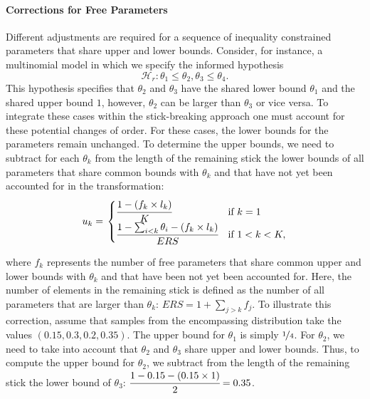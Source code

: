 \begin{appendix}
\hypertarget{corrections-for-free-parameters}{%
\paragraph{Corrections for Free
Parameters}\label{corrections-for-free-parameters}}

Different adjustments are required for a sequence of inequality
constrained parameters that share upper and lower bounds. Consider, for
instance, a multinomial model in which we specify the informed
hypothesis
\[\mathcal{H}_r: \theta_1 \leq \theta_2, \theta_3 \leq \theta_4.\] This
hypothesis specifies that \(\theta_2\) and \(\theta_3\) have the shared
lower bound \(\theta_1\) and the shared upper bound \(1\), however,
\(\theta_2\) can be larger than \(\theta_3\) or vice versa. To integrate
these cases within the stick-breaking approach one must account for
these potential changes of order. For these cases, the lower bounds for
the parameters remain unchanged. To determine the upper bounds, we need
to subtract for each \(\theta_k\) from the length of the remaining stick
the lower bounds of all parameters that share common bounds with
\(\theta_k\) and that have not yet been accounted for in the
transformation: \begin{align}
  u_k = \left.
  \begin{cases}
      \cfrac{1 - (f_k \times l_k)}{K} & \text{if } k = 1 \\
      \cfrac{1 - \sum_{i < k} \theta_i - (f_k \times l_k)}{ERS} & \text{if } 1 < k < K,
  \end{cases}
    \right.
\end{align}

where \(f_k\) represents the number of free parameters that share common
upper and lower bounds with \(\theta_k\) and that have been not yet been
accounted for. Here, the number of elements in the remaining stick is
defined as the number of all parameters that are larger than
\(\theta_k\): \(ERS = 1 + \sum_{j > k} f_j\). To illustrate this
correction, assume that samples from the encompassing distribution take
the values \((0.15, 0.3, 0.2, 0.35)\). The upper bound for \(\theta_1\)
is simply \(\nicefrac{1}{4}\). For \(\theta_2\), we need to take into
account that \(\theta_2\) and \(\theta_3\) share upper and lower bounds.
Thus, to compute the upper bound for \(\theta_2\), we subtract from the
length of the remaining stick the lower bound of \(\theta_3\):
\(\cfrac{1 - 0.15 - (0.15 \times 1)}{2} = 0.35\).


\end{appendix}
